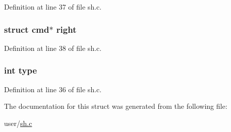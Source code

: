 Definition at line 37 of file sh.\-c.

\hypertarget{structpipecmd_ab5429c86b9ebd1279ea5674110a2190b}{
\subsubsection[{right}]{\setlength{\rightskip}{0pt plus 5cm}struct {\bf cmd}$\ast$ right}}\label{structpipecmd_ab5429c86b9ebd1279ea5674110a2190b}


Definition at line 38 of file sh.\-c.

\hypertarget{structpipecmd_ac765329451135abec74c45e1897abf26}{
\subsubsection[{type}]{\setlength{\rightskip}{0pt plus 5cm}int type}}\label{structpipecmd_ac765329451135abec74c45e1897abf26}


Definition at line 36 of file sh.\-c.



The documentation for this struct was generated from the following file\-:\begin{DoxyCompactItemize}
\item 
user/\hyperlink{sh_8c}{sh.\-c}\end{DoxyCompactItemize}
